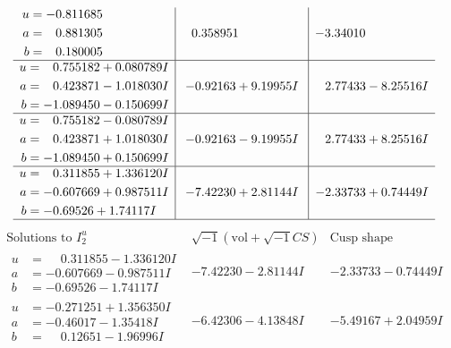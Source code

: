 \documentclass[1p]{elsarticle_modified}
\theoremstyle{definition}
\newcommand{\I}{\sqrt{-1}}
\begin{document}
$$\begin{array}{c|c|c}
\begin{aligned}
u &= -0.811685\phantom{ +0.000000I} \\
a &= \phantom{-}0.881305\phantom{ +0.000000I} \\
b &= \phantom{-}0.180005\phantom{ +0.000000I}\end{aligned}
 & \phantom{-}0.358951\phantom{ +0.000000I} & -3.34010\phantom{ +0.000000I} \\ \hline\begin{aligned}
u &= \phantom{-}0.755182 + 0.080789 I \\
a &= \phantom{-}0.423871 - 1.018030 I \\
b &= -1.089450 - 0.150699 I\end{aligned}
 & -0.92163 + 9.19955 I & \phantom{-}2.77433 - 8.25516 I \\ \hline\begin{aligned}
u &= \phantom{-}0.755182 - 0.080789 I \\
a &= \phantom{-}0.423871 + 1.018030 I \\
b &= -1.089450 + 0.150699 I\end{aligned}
 & -0.92163 - 9.19955 I & \phantom{-}2.77433 + 8.25516 I \\ \hline\begin{aligned}
u &= \phantom{-}0.311855 + 1.336120 I \\
a &= -0.607669 + 0.987511 I \\
b &= -0.69526 + 1.74117 I\end{aligned}
 & -7.42230 + 2.81144 I & -2.33733 + 0.74449 I\\
 \hline 
 \end{array}$$\newpage$$\begin{array}{c|c|c}  
\text{Solutions to }I^u_{2}& \I (\text{vol} + \sqrt{-1}CS) & \text{Cusp shape}\\
 \hline 
\begin{aligned}
u &= \phantom{-}0.311855 - 1.336120 I \\
a &= -0.607669 - 0.987511 I \\
b &= -0.69526 - 1.74117 I\end{aligned}
 & -7.42230 - 2.81144 I & -2.33733 - 0.74449 I \\ \hline\begin{aligned}
u &= -0.271251 + 1.356350 I \\
a &= -0.46017 - 1.35418 I \\
b &= \phantom{-}0.12651 - 1.96996 I\end{aligned}
 & -6.42306 - 4.13848 I & -5.49167 + 2.04959 I \\ \hline\begin{aligned}

\end{aligned}
\end{array}$$
\end{document}
